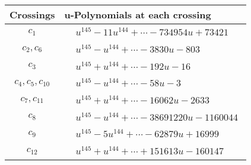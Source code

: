 \documentclass[1p]{elsarticle_modified}
\theoremstyle{definition}
\begin{document}
\begin{tabular}{m{50pt}|m{274pt}}
Crossings & \hspace{64pt}u-Polynomials at each crossing \\
\hline $$\begin{aligned}c_{1}\end{aligned}$$&$\begin{aligned}
&u^{145}-11 u^{144}+\cdots-734954 u+73421
\end{aligned}$\\
\hline $$\begin{aligned}c_{2},c_{6}\end{aligned}$$&$\begin{aligned}
&u^{145}- u^{144}+\cdots-3830 u-803
\end{aligned}$\\
\hline $$\begin{aligned}c_{3}\end{aligned}$$&$\begin{aligned}
&u^{145}+u^{144}+\cdots-192 u-16
\end{aligned}$\\
\hline $$\begin{aligned}c_{4},c_{5},c_{10}\end{aligned}$$&$\begin{aligned}
&u^{145}- u^{144}+\cdots-58 u-3
\end{aligned}$\\
\hline $$\begin{aligned}c_{7},c_{11}\end{aligned}$$&$\begin{aligned}
&u^{145}+u^{144}+\cdots-16062 u-2633
\end{aligned}$\\
\hline $$\begin{aligned}c_{8}\end{aligned}$$&$\begin{aligned}
&u^{145}- u^{144}+\cdots-38691220 u-1160044
\end{aligned}$\\
\hline $$\begin{aligned}c_{9}\end{aligned}$$&$\begin{aligned}
&u^{145}-5 u^{144}+\cdots-62879 u+16999
\end{aligned}$\\
\hline $$\begin{aligned}c_{12}\end{aligned}$$&$\begin{aligned}
&u^{145}+u^{144}+\cdots+151613 u-160147
\end{aligned}$\\
\hline
\end{tabular}\\~\\
\end{document}
